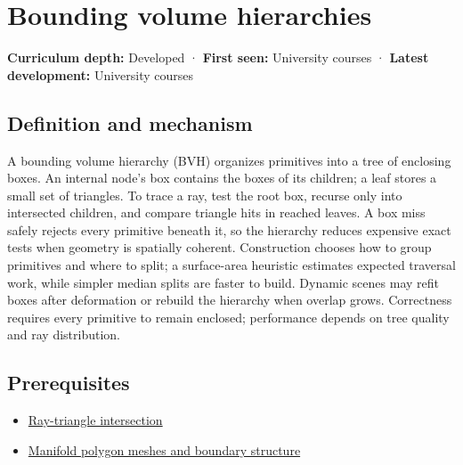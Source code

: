 \hypertarget{appendix-0b426c47dd78}{}\label{referencestart:appendix-0b426c47dd78}
\section{Bounding volume hierarchies}\label{appendix-0b426c47dd78-bounding-volume-hierarchies}

\hypertarget{appendix-0b426c47dd78-bounding-volume-hierarchies}{}

\textbf{Curriculum depth:} Developed · \textbf{First seen:} University courses · \textbf{Latest development:} University courses

\begin{allmightroledefinition}

\subsection{Definition and mechanism}\label{appendix-0b426c47dd78-definition-and-mechanism}

\hypertarget{appendix-0b426c47dd78-definition-and-mechanism}{}

A bounding volume hierarchy (BVH) organizes primitives into a tree of enclosing boxes. An internal node's box contains the boxes of its children; a leaf stores a small set of triangles. To trace a ray, test the root box, recurse only into intersected children, and compare triangle hits in reached leaves. A box miss safely rejects every primitive beneath it, so the hierarchy reduces expensive exact tests when geometry is spatially coherent. Construction chooses how to group primitives and where to split; a surface-area heuristic estimates expected traversal work, while simpler median splits are faster to build. Dynamic scenes may refit boxes after deformation or rebuild the hierarchy when overlap grows. Correctness requires every primitive to remain enclosed; performance depends on tree quality and ray distribution.

\end{allmightroledefinition}

\subsection{Prerequisites}\label{appendix-0b426c47dd78-prerequisites}

\hypertarget{appendix-0b426c47dd78-prerequisites}{}

\begin{itemize}
\tightlist
\item
  \hyperref[appendix-47ac1bd6d144]{Ray-triangle intersection}
\item
  \hyperref[appendix-fab348609369]{Manifold polygon meshes and boundary structure}
\end{itemize}

